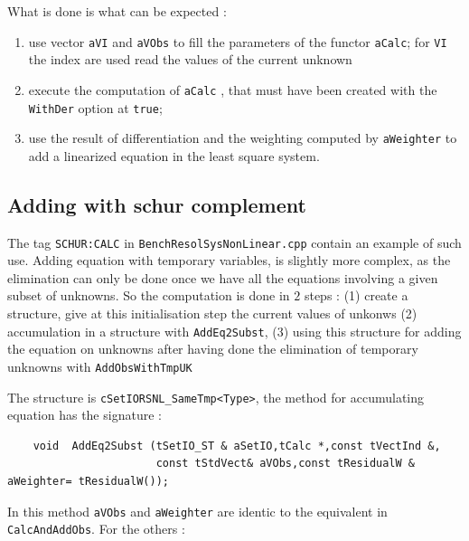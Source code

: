 What is done is what can be expected :

\begin{enumerate}
   \item  use  vector {\tt aVI} and {\tt aVObs}  to fill the parameters
          of the functor {\tt aCalc}; for {\tt VI} the index are used read the 
          values of the current unknown

   \item  execute the computation of {\tt aCalc} , that must  have been created
          with the {\tt WithDer} option at {\tt true};

   \item  use the result of differentiation and the weighting computed by {\tt aWeighter}
          to add a linearized equation in the least square system.
\end{enumerate}



\subsection{Adding with schur complement}

The tag  {\tt  SCHUR:CALC} in {\tt BenchResolSysNonLinear.cpp} contain an example of such use.
Adding equation with temporary variables, is slightly more complex, as the elimination
can only be done once we have all the equations involving a given subset of unknowns.
So the computation is done in $2$ steps : (1) create a structure, give at this initialisation
step  the current values of unkonws (2) accumulation in a structure 
with {\tt AddEq2Subst}, (3) using this structure
for adding the equation on unknowns after having done the elimination of temporary unknowns with
{\tt  AddObsWithTmpUK}

The structure is {\tt cSetIORSNL\_SameTmp<Type>}, the method for accumulating 
equation has the signature :

\begin{lstlisting}
    void  AddEq2Subst (tSetIO_ST & aSetIO,tCalc *,const tVectInd &,
                       const tStdVect& aVObs,const tResidualW & aWeighter= tResidualW());
\end{lstlisting}

In this method {\tt aVObs} and {\tt aWeighter} are identic to the equivalent in
{\tt CalcAndAddObs}. For the others :

